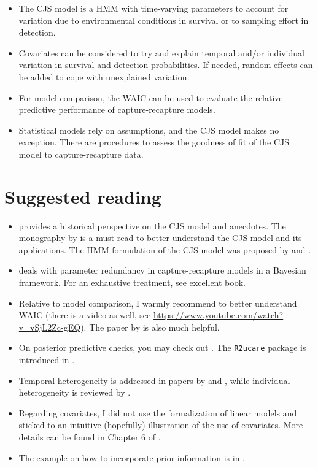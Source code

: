 \documentclass[
  12pt,
]{krantz}
\begin{document}
\begin{itemize}
\item
  The CJS model is a HMM with time-varying parameters to account for variation due to environmental conditions in survival or to sampling effort in detection.
\item
  Covariates can be considered to try and explain temporal and/or individual variation in survival and detection probabilities. If needed, random effects can be added to cope with unexplained variation.
\item
  For model comparison, the WAIC can be used to evaluate the relative predictive performance of capture-recapture models.
\item
  Statistical models rely on assumptions, and the CJS model makes no exception. There are procedures to assess the goodness of fit of the CJS model to capture-recapture data.
\end{itemize}

\section{Suggested reading}\label{suggested-reading-3}

\begin{itemize}
\item
  \citet{buckland2016} provides a historical perspective on the CJS model and anecdotes. The monography by \citet{LebretonEtAl1992} is a must-read to better understand the CJS model and its applications. The HMM formulation of the CJS model was proposed by \citet{gimenez2007} and \citet{royle2008}.
\item
  \citet{gimenez2009} deals with parameter redundancy in capture-recapture models in a Bayesian framework. For an exhaustive treatment, see \citet{cole2020} excellent book.
\item
  Relative to model comparison, I warmly recommend \citet{mcelreathbook} to better understand WAIC (there is a video as well, see \url{https://www.youtube.com/watch?v=vSjL2Zc-gEQ}). The paper by \citet{gelman2004} is also much helpful.
\item
  On posterior predictive checks, you may check out \citet{conn2018}. The \texttt{R2ucare} package is introduced in \citet{gimenez2018r2ucare}.
\item
  Temporal heterogeneity is addressed in papers by \citet{grosbois_assessing_2008} and \citet{frederiksen2014}, while individual heterogeneity is reviewed by \citet{gimenez2018ih}.
\item
  Regarding covariates, I did not use the formalization of linear models and sticked to an intuitive (hopefully) illustration of the use of covariates. More details can be found in Chapter 6 of \citet{cooch2017intromark}.
\item
  The example on how to incorporate prior information is in \citet{mccarthy2005}.
\end{itemize}
\end{document}
